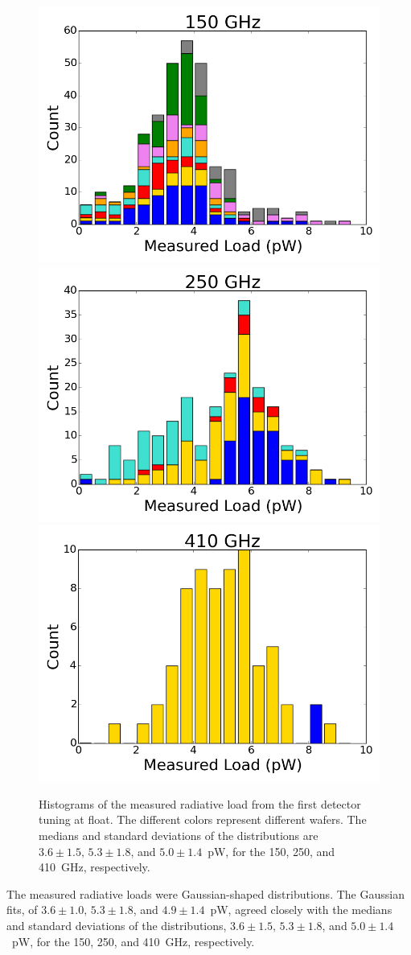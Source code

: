 \begin{figure}[ht!]
\begin{center}
\includegraphics[width=0.32\columnwidth]{figures/ep2_150_radiative_load_hist}
\includegraphics[width=0.32\columnwidth]{figures/ep2_250_radiative_load_hist}
\includegraphics[width=0.32\columnwidth]{figures/ep2_410_radiative_load_hist}
\caption{Histograms of the measured radiative load from the first detector tuning at float. The different colors represent 
different wafers.  The medians and standard deviations of the distributions are $3.6\pm 1.5, \, 5.3\pm 1.8$, and $5.0 \pm 1.4$~pW, 
for the 150, 250, and 410~GHz, respectively. 
\label{fig:radiative_load_histograms} }
\end{center}
\end{figure}

The measured radiative loads were Gaussian-shaped distributions. 
The Gaussian fits, of $3.6\pm 1.0, \, 5.3\pm 1.8$, and $4.9 \pm 1.4$~pW, agreed closely with the  medians and standard deviations of the distributions, $3.6\pm 1.5, \, 5.3\pm 1.8$, and $5.0 \pm 1.4$~pW, 
for the 150, 250, and 410~GHz, respectively. 




